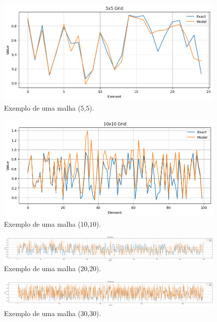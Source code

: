 \documentclass[final,5p]{elsarticle}
\numberwithin{equation}{section}
\begin{document}
    \begin{figure}[hbt!]
        \centering
        \includegraphics[width=0.95\columnwidth]{./fig/5x5.png}
        \caption{Exemplo de uma malha ($5$,$5$).}\label{fig:5x5}
    \end{figure}

    \begin{figure}[hbt!]
        \centering
        \includegraphics[width=0.95\columnwidth]{./fig/10x10.png}
        \caption{Exemplo de uma malha ($10$,$10$).}\label{fig:10x10}
    \end{figure}

    \begin{figure}[hbt!]
        \centering
        \includegraphics[width=0.95\columnwidth]{./fig/20x20.png}
        \caption{Exemplo de uma malha ($20$,$20$).}\label{fig:20x20}
    \end{figure}

    \begin{figure}[hbt!]
        \centering
        \includegraphics[width=0.95\columnwidth]{./fig/30x30.png}
        \caption{Exemplo de uma malha ($30$,$30$).}\label{fig:30x30}
    \end{figure}
\end{document}
